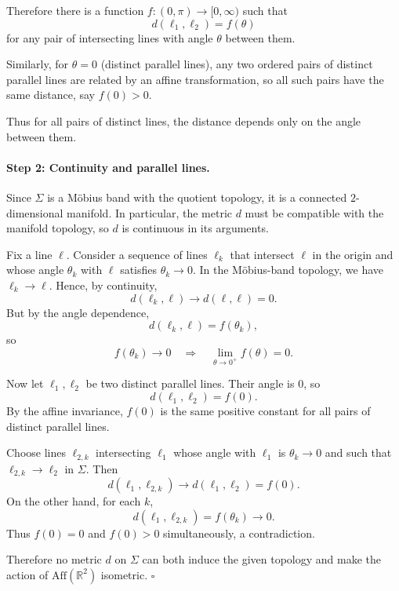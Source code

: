 \documentclass[12pt,a4paper]{article}
\theoremstyle{plain}
\theoremstyle{definition}      %
\begin{document}
	Therefore there is a function $f:(0,\pi)\to[0,\infty)$ such that
	\[
	d(\ell_1,\ell_2) = f(\theta)
	\]
	for any pair of intersecting lines with angle $\theta$ between them.
	
	Similarly, for $\theta=0$ (distinct parallel lines), any two ordered pairs of
	distinct parallel lines are related by an affine transformation, so all such
	pairs have the same distance, say $f(0)>0$.
	
	Thus for all pairs of distinct lines, the distance depends only on the angle
	between them.
	
	\paragraph{Step 2: Continuity and parallel lines.}
	
	Since $\Sigma$ is a M\"obius band with the quotient topology, it is a connected
	$2$-dimensional manifold.  In particular, the metric $d$ must be compatible
	with the manifold topology, so $d$ is continuous in its arguments.
	
	Fix a line $\ell$.  Consider a sequence of lines $\ell_k$ that intersect $\ell$
	in the origin and whose angle $\theta_k$ with $\ell$ satisfies $\theta_k\to 0$.
	In the M\"obius-band topology, we have $\ell_k\to\ell$.  Hence, by continuity,
	\[
	d(\ell_k,\ell) \longrightarrow d(\ell,\ell)=0.
	\]
	But by the angle dependence,
	\[
	d(\ell_k,\ell) = f(\theta_k),
	\]
	so
	\[
	f(\theta_k)\longrightarrow 0
	\quad\Rightarrow\quad
	\lim_{\theta\to 0^+} f(\theta) = 0.
	\]
	
	Now let $\ell_1,\ell_2$ be two distinct parallel lines.  Their angle is $0$, so
	\[
	d(\ell_1,\ell_2) = f(0).
	\]
	By the affine invariance, $f(0)$ is the same positive constant for all pairs
	of distinct parallel lines.
	
	Choose lines $\ell_{2,k}$ intersecting $\ell_1$ whose angle with $\ell_1$ is
	$\theta_k\to 0$ and such that $\ell_{2,k}\to\ell_2$ in $\Sigma$.  Then
	\[
	d(\ell_1,\ell_{2,k}) \to d(\ell_1,\ell_2) = f(0).
	\]
	On the other hand, for each $k$,
	\[
	d(\ell_1,\ell_{2,k}) = f(\theta_k) \longrightarrow 0.
	\]
	Thus $f(0)=0$ and $f(0)>0$ simultaneously, a contradiction.
	
	Therefore no metric $d$ on $\Sigma$ can both induce the given topology and
	make the action of $\mathrm{Aff}(\mathbb{R}^2)$ isometric.
	\hfill $\square$
	
\end{document}
